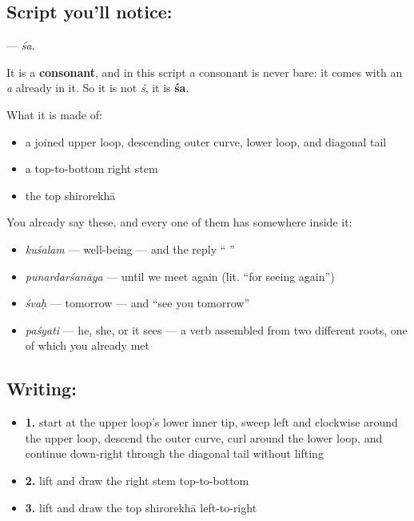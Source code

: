 \subsection*{Script you'll notice: }
\textbf{} — \emph{śa}.

It is a \textbf{consonant}, and in this script a consonant is never bare: it comes with an \emph{a} already in it. So it is not \emph{ś}, it is \textbf{śa}.

What it is made of:

\begin{itemize}
\raggedright
  \item a joined upper loop, descending outer curve, lower loop, and diagonal tail
  \item a top-to-bottom right stem
  \item the top shirorekhā
\end{itemize}

You already say these, and every one of them has  somewhere inside it:

\begin{itemize}
\raggedright
  \item \textbf{} \emph{kuśalam} — well-being — and the reply \textquotedblleft{}  \textquotedblright{}
  \item \textbf{} \emph{punardarśanāya} — until we meet again (lit. \textquotedblleft{}for seeing again\textquotedblright{})
  \item \textbf{} \emph{śvaḥ} — tomorrow — and \textquotedblleft{}see you tomorrow\textquotedblright{}
  \item \textbf{} \emph{paśyati} — he, she, or it sees — a verb assembled from two different roots, one of which you already met
\end{itemize}

\subsection*{Writing: }

\begin{itemize}
\raggedright
  \item \textbf{1.} start at the upper loop's lower inner tip, sweep left and clockwise around the upper loop, descend the outer curve, curl around the lower loop, and continue down-right through the diagonal tail without lifting
  \item \textbf{2.} lift and draw the right stem top-to-bottom
  \item \textbf{3.} lift and draw the top shirorekhā left-to-right
\end{itemize}

